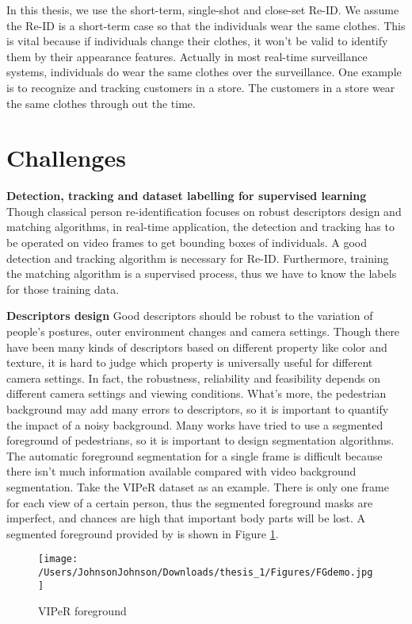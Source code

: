 In this thesis, we use the short-term, single-shot and close-set Re-ID. We assume the Re-ID is a short-term case so that the individuals wear the same clothes. This is vital because if individuals change their clothes, it won't be valid to identify them by their appearance features. Actually in most real-time surveillance systems, individuals do wear the same clothes over the surveillance. One example is to recognize and tracking customers in a store. The customers in a store wear the same clothes through out the time.

\section{Challenges}

\textbf{Detection, tracking and dataset labelling for supervised learning} Though classical person re-identification focuses on robust descriptors design and matching algorithms, in real-time application, the detection and tracking has to be operated on video frames to get bounding boxes of individuals. A good detection and tracking algorithm is necessary for Re-ID. Furthermore, training the matching algorithm is a supervised process, thus we have to know the labels for those training data. 

\textbf{Descriptors design} Good descriptors should be robust to the variation of people's postures, outer environment changes and camera settings. Though there have been many kinds of descriptors based on different property like color and texture, it is hard to judge which property is universally useful for different camera settings. In fact, the robustness, reliability and feasibility depends on different camera settings and viewing conditions. What's more, the pedestrian background may add many errors to descriptors, so it is important to quantify the impact of a noisy background. Many works have tried to use a segmented foreground of pedestrians, so it is important to design segmentation algorithms. The automatic foreground segmentation for a single frame is difficult because there isn't much information available compared with video background segmentation. Take the VIPeR dataset as an example. There is only one frame for each view of a certain person, thus the segmented foreground masks are imperfect, and chances are high that important body parts will be lost. A segmented foreground provided by \cite{SDALF} is shown in Figure \ref{VIPeRFG}.
\begin{figure}[H]
\centering
\texttt{[image: /Users/JohnsonJohnson/Downloads/thesis\_1/Figures/FGdemo.jpg]}
\vspace{-3em}
\caption{VIPeR foreground}
\label{VIPeRFG}
\end{figure}

